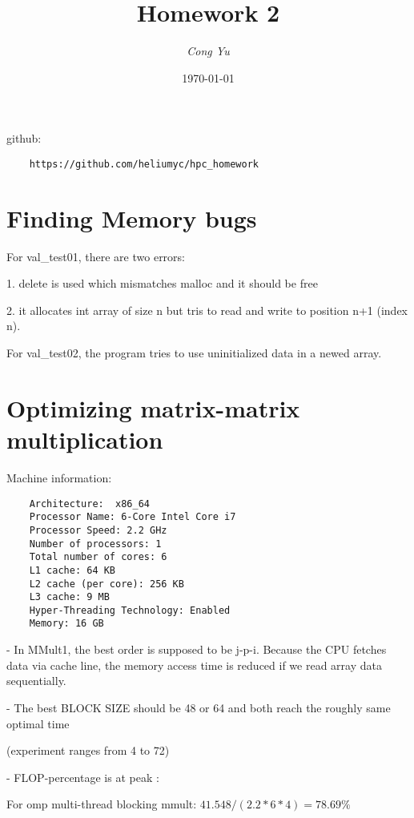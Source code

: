 \documentclass[titlepage]{article}
\title{
    Homework 2
}
\author{\itshape Cong Yu}
\date{\AdvanceDate[-2]\today}
\begin{document}
\maketitle

\setlength{\parindent}{0em}
\setlength{\parskip}{0.5em}

github: 
\begin{verbatim}
    https://github.com/heliumyc/hpc_homework
\end{verbatim}

\section{Finding Memory bugs}

For val\_test01, there are two errors: 

\hspace{2em} 1. delete is used which mismatches malloc and it should be free
    
\hspace{2em} 2. it allocates int array of size n but tris to read and write to position n+1 (index n).

For val\_test02, the program tries to use uninitialized data in a newed array.

\section{Optimizing matrix-matrix multiplication}

Machine information:
\begin{verbatim}
    Architecture:  x86_64
    Processor Name: 6-Core Intel Core i7
    Processor Speed: 2.2 GHz 
    Number of processors: 1 
    Total number of cores: 6 
    L1 cache: 64 KB
    L2 cache (per core): 256 KB 
    L3 cache: 9 MB 
    Hyper-Threading Technology: Enabled    
    Memory: 16 GB 
\end{verbatim}

- In MMult1, the best order is supposed to be j-p-i. Because 
the CPU fetches data via cache line, the memory access time is reduced 
if we read array data sequentially. 

- The best BLOCK SIZE should be 48 or 64 and both reach the roughly same optimal time

(experiment ranges from 4 to 72)


- FLOP-percentage is at peak :

For omp multi-thread blocking mmult: $ 41.548/(2.2*6*4) = 78.69\% $
\end{document}
